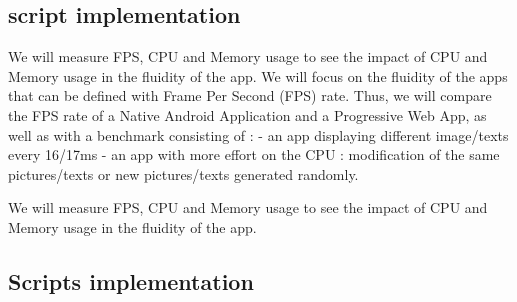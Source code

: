 \subsection{script implementation}

We will measure FPS, CPU and Memory usage to see the impact of CPU and Memory usage in the fluidity of the app.
\newline
We will focus on the fluidity of the apps that can be defined with Frame Per Second (FPS) rate.
Thus, we will compare the FPS rate of a Native Android Application and a Progressive Web App, as well as with a benchmark consisting of : 
    - an app displaying different image/texts every 16/17ms
    - an app with more effort on the CPU : modification of the same pictures/texts or new pictures/texts generated randomly.
\newline

We will measure FPS, CPU and Memory usage to see the impact of CPU and Memory usage in the fluidity of the app.
\newline

\subsection{Scripts implementation}

